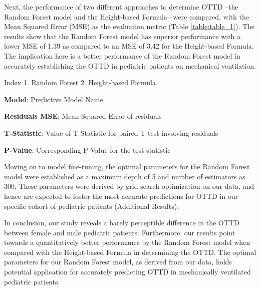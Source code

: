 \documentclass[11pt]{article}
\begin{document}
Next, the performance of two different approaches to determine OTTD --the Random Forest model and the Height-based Formula-- were compared, with the Mean Squared Error (MSE) as the evaluation metric (Table \ref{table:table_1}). The results show that the Random Forest model has superior performance with a lower MSE of 1.39 as compared to an MSE of 3.42 for the Height-based Formula. The implication here is a better performance of the Random Forest model in accurately establishing the OTTD in pediatric patients on mechanical ventilation.

\begin{table}[h]
\caption{Model performance comparison: Random Forest vs. Height-based Formula}
\label{table:table_1}
\begin{threeparttable}
\renewcommand{\TPTminimum}{\linewidth}
\begin{tablenotes}
\footnotesize
\item Index
1. Random Forest
2. Height-based Formula
\item \textbf{Model}: Predictive Model Name
\item \textbf{Residuals MSE}: Mean Squared Error of residuals
\item \textbf{T-Statistic}: Value of T-Statistic for paired T-test involving residuals
\item \textbf{P-Value}: Corresponding P-Value for the test statistic
\end{tablenotes}
\end{threeparttable}
\end{table}


Moving on to model fine-tuning, the optimal parameters for the Random Forest model were established as a maximum depth of 5 and number of estimators as 300. These parameters were derived by grid search optimization on our data, and hence are expected to foster the most accurate predictions for OTTD in our specific cohort of pediatric patients (Additional Results).

In conclusion, our study reveals a barely perceptible difference in the OTTD between female and male pediatric patients. Furthermore, our results point towards a quantitatively better performance by the Random Forest model when compared with the Height-based Formula in determining the OTTD. The optimal parameters for our Random Forest model, as derived from our data, holds potential application for accurately predicting OTTD in mechanically ventilated pediatric patients.
\end{document}
